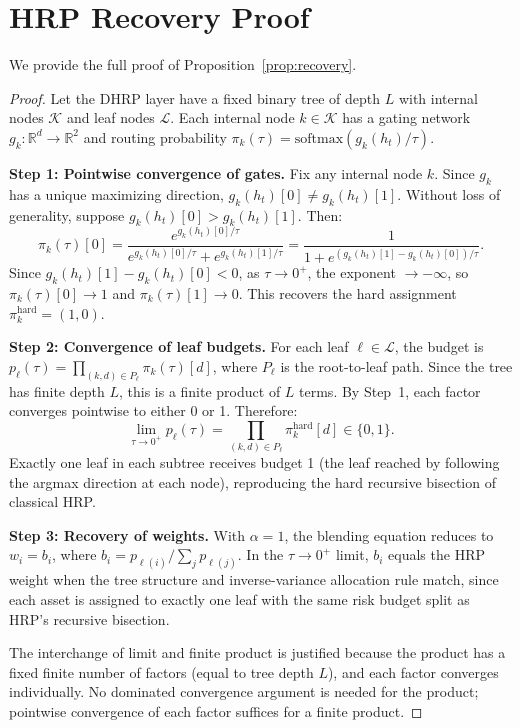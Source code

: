 \documentclass{article}
\begin{document}
\newpage
\appendix

\section{HRP Recovery Proof}
\label{app:proof}

We provide the full proof of Proposition~\ref{prop:recovery}.

\begin{proof}
Let the DHRP layer have a fixed binary tree of depth $L$ with internal nodes $\mathcal{K}$ and leaf nodes $\mathcal{L}$. Each internal node $k \in \mathcal{K}$ has a gating network $g_k: \mathbb{R}^d \to \mathbb{R}^2$ and routing probability $\pi_k(\tau) = \mathrm{softmax}(g_k(h_t)/\tau)$.

\textbf{Step 1: Pointwise convergence of gates.}
Fix any internal node $k$. Since $g_k$ has a unique maximizing direction, $g_k(h_t)[0] \neq g_k(h_t)[1]$. Without loss of generality, suppose $g_k(h_t)[0] > g_k(h_t)[1]$. Then:
\[
\pi_k(\tau)[0] = \frac{e^{g_k(h_t)[0]/\tau}}{e^{g_k(h_t)[0]/\tau} + e^{g_k(h_t)[1]/\tau}} = \frac{1}{1 + e^{(g_k(h_t)[1] - g_k(h_t)[0])/\tau}}.
\]
Since $g_k(h_t)[1] - g_k(h_t)[0] < 0$, as $\tau \to 0^+$, the exponent $\to -\infty$, so $\pi_k(\tau)[0] \to 1$ and $\pi_k(\tau)[1] \to 0$. This recovers the hard assignment $\pi_k^{\text{hard}} = (1, 0)$.

\textbf{Step 2: Convergence of leaf budgets.}
For each leaf $\ell \in \mathcal{L}$, the budget is $p_\ell(\tau) = \prod_{(k,d) \in P_\ell} \pi_k(\tau)[d]$, where $P_\ell$ is the root-to-leaf path. Since the tree has finite depth $L$, this is a finite product of $L$ terms. By Step~1, each factor converges pointwise to either 0 or 1. Therefore:
\[
\lim_{\tau \to 0^+} p_\ell(\tau) = \prod_{(k,d) \in P_\ell} \pi_k^{\text{hard}}[d] \in \{0, 1\}.
\]
Exactly one leaf in each subtree receives budget 1 (the leaf reached by following the argmax direction at each node), reproducing the hard recursive bisection of classical HRP.

\textbf{Step 3: Recovery of weights.}
With $\alpha = 1$, the blending equation reduces to $w_i = b_i$, where $b_i = p_{\ell(i)} / \sum_j p_{\ell(j)}$. In the $\tau \to 0^+$ limit, $b_i$ equals the HRP weight when the tree structure and inverse-variance allocation rule match, since each asset is assigned to exactly one leaf with the same risk budget split as HRP's recursive bisection.

The interchange of limit and finite product is justified because the product has a fixed finite number of factors (equal to tree depth $L$), and each factor converges individually. No dominated convergence argument is needed for the product; pointwise convergence of each factor suffices for a finite product.
\end{proof}
\end{document}
